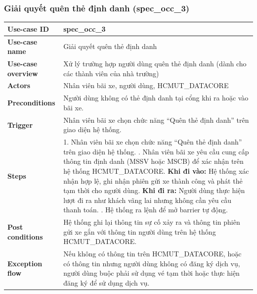 \subsubsection{Giải quyết quên thẻ định danh (spec\_occ\_3)}
\begingroup
\small
\begin{longtable}{|>{\centering\arraybackslash}m{3cm}|m{13.7cm}|}
\hline
\textbf{Use-case ID} & spec\_occ\_3   \\ \hline
\textbf{Use-case name} & Giải quyết quên thẻ định danh   \\ \hline
\textbf{Use-case overview} & Xử lý trường hợp người dùng quên thẻ định danh (dành cho các thành viên của nhà trường)  \\ \hline
\textbf{Actors} & Nhân viên bãi xe, người dùng, HCMUT\_DATACORE   \\ \hline
\textbf{Preconditions} & Người dùng không có thẻ định danh tại cổng khi ra hoặc vào bãi xe. \\ \hline
\textbf{Trigger} & Nhân viên bãi xe chọn chức năng “Quên thẻ định danh” trên giao diện hệ thống. \\ \hline
\textbf{Steps} & 
1. Nhân viên bãi xe chọn chức năng “Quên thẻ định danh” trên giao diện hệ thống. \newline
2. Nhân viên bãi xe yêu cầu cung cấp thông tin định danh (MSSV hoặc MSCB) để xác nhận trên hệ thống HCMUT\_DATACORE. \newline
3.1 \textbf{Khi đi vào:} Hệ thống xác nhận hợp lệ, ghi nhận phiên gửi xe thành công và phát thẻ tạm thời cho người dùng. \newline
3.2 \textbf{Khi đi ra:} Người dùng thực hiện lượt đi ra như khách vãng lai nhưng không cần yêu cầu thanh toán.  \newline
4. Hệ thống ra lệnh để mở barrier tự động. \\ \hline
\textbf{Post conditions} & Hệ thống ghi lại thông tin sự cố xảy ra và thông tin phiên gửi xe gắn với thông tin người dùng trên hệ thống HCMUT\_DATACORE. \\ \hline
\textbf{Exception flow} & Nếu không có thông tin trên HCMUT\_DATACORE, hoặc có thông tin nhưng người dùng không có đăng ký dịch vụ, người dùng buộc phải sử dụng vé tạm thời hoặc thực hiện đăng ký để sử dụng dịch vụ. \\ \hline
\end{longtable}
\endgroup

